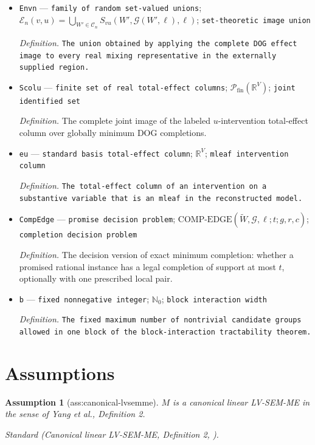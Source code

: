 \documentclass{article}
\newtheorem{assumption}{Assumption}
\begin{document}
\begin{itemize}
  \item \texttt{Envn} --- \texttt{family of random set-\allowbreak{}valued unions}; \(\mathcal E_n(v,u)=\bigcup_{W'\in\mathcal C_n}S_{vu}(W',\mathcal G(W',\ell),\ell)\); \texttt{set-\allowbreak{}theoretic image union}
  \par\smallskip\noindent\emph{Definition.} \texttt{The union obtained by applying the complete DOG effect image to every real mixing representative in the externally supplied region.}
  \item \texttt{Scolu} --- \texttt{finite set of real total-\allowbreak{}effect columns}; \(\mathcal P_{\mathrm{fin}}(\mathbb R^V)\); \texttt{joint identified set}
  \par\smallskip\noindent\emph{Definition.} The complete joint image of the labeled \(u\)-intervention total-effect column over globally minimum DOG completions.
  \item \texttt{eu} --- \texttt{standard basis total-\allowbreak{}effect column}; \(\mathbb R^V\); \texttt{mleaf intervention column}
  \par\smallskip\noindent\emph{Definition.} \texttt{The total-\allowbreak{}effect column of an intervention on a substantive variable that is an mleaf in the reconstructed model.}
  \item \texttt{CompEdge} --- \texttt{promise decision problem}; \(\mathrm{COMP\text{-}EDGE}(\widetilde W,\mathcal G,\ell;t;g,r,c)\); \texttt{completion decision problem}
  \par\smallskip\noindent\emph{Definition.} The decision version of exact minimum completion: whether a promised rational instance has a legal completion of support at most \(t\), optionally with one prescribed local pair.
  \item \texttt{b} --- \texttt{fixed nonnegative integer}; \(\mathbb N_0\); \texttt{block interaction width}
  \par\smallskip\noindent\emph{Definition.} \texttt{The fixed maximum number of nontrivial candidate groups allowed in one block of the block-\allowbreak{}interaction tractability theorem.}
\end{itemize}

\section{Assumptions}

\begin{assumption}[ass:canonical-lvsemme]\label{ass:canonical-lvsemme}
\(M\) is a canonical linear LV-SEM-ME in the sense of Yang et al., Definition 2.
\par\smallskip\noindent\emph{Standard} (Canonical linear LV-SEM-ME, Definition 2, \cite{YangNafeaKiyavashZhangGhassami2026}).
\end{assumption}
\end{document}
